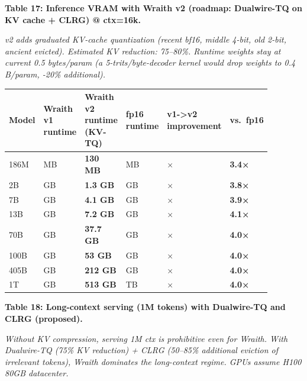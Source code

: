 \textbf{Table 17: Inference VRAM with Wraith v2 (roadmap: Dualwire-TQ on
KV cache + CLRG) @ ctx=16k.}

\emph{v2 adds graduated KV-cache quantization (recent bf16, middle
4-bit, old 2-bit, ancient evicted). Estimated KV reduction: 75--80\%.
Runtime weights stay at current 0.5 bytes/param (a 5-trits/byte-decoder
kernel would drop weights to 0.4 B/param, -20\% additional).}

{\def\LTcaptype{none} %
{\footnotesize\setlength{\tabcolsep}{3pt}
\begin{longtable}[]{@{}>{\raggedright\arraybackslash}p{0.147\linewidth}>{\raggedright\arraybackslash}p{0.147\linewidth}>{\raggedright\arraybackslash}p{0.147\linewidth}>{\raggedright\arraybackslash}p{0.147\linewidth}>{\raggedright\arraybackslash}p{0.147\linewidth}>{\raggedright\arraybackslash}p{0.147\linewidth}@{}}
\toprule\noalign{}
Model & Wraith v1 runtime & Wraith v2 runtime (KV-TQ) & fp16 runtime & v1->v2 improvement & vs.~fp16 \\
\midrule\noalign{}
\endhead
\bottomrule\noalign{}
\endlastfoot
186M & 168 MB & \textbf{130 MB} & 447 MB & 1.3× & \textbf{3.4×} \\
2B & 1.9 GB & \textbf{1.3 GB} & 4.9 GB & 1.5× & \textbf{3.8×} \\
7B & 5.6 GB & \textbf{4.1 GB} & 16.1 GB & 1.4× & \textbf{3.9×} \\
13B & 9.8 GB & \textbf{7.2 GB} & 29.3 GB & 1.4× & \textbf{4.1×} \\
70B & 45.5 GB & \textbf{37.7 GB} & 151 GB & 1.2× & \textbf{4.0×} \\
100B & 62.5 GB & \textbf{53 GB} & 214 GB & 1.2× & \textbf{4.0×} \\
405B & 236 GB & \textbf{212 GB} & 848 GB & 1.1× & \textbf{4.0×} \\
1T & 557 GB & \textbf{513 GB} & 2.06 TB & 1.1× & \textbf{4.0×} \\
\end{longtable}
}
}

\textbf{Table 18: Long-context serving (1M tokens) with Dualwire-TQ and
CLRG (proposed).}

\emph{Without KV compression, serving 1M ctx is prohibitive even for
Wraith. With Dualwire-TQ (75\% KV reduction) + CLRG (50--85\% additional
eviction of irrelevant tokens), Wraith dominates the long-context
regime. GPUs assume H100 80GB datacenter.}

